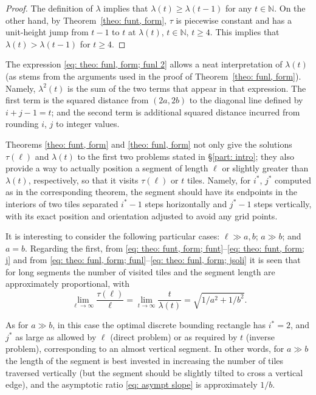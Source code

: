 \documentclass[12pt, a4paper]{article}
\newcommand{\funt}{\tau} %
\newcommand{\funl}{\lambda} %
\newcommand{\len}{\ell} %
\newcommand{\tiles}{t} %
\newcommand{\isoli}{i^\ast}
\newcommand{\jsoli}{j^\ast}
\begin{document}
\begin{proof}
The definition of $\funl$ implies that $\funl(\tiles) \geq \funl(\tiles-1)$ for any $\tiles \in \mathbb N$. On the other hand, 
by Theorem~\ref{theo: funt, form}, $\funt$ is piecewise constant and has a unit-height jump from $\tiles-1$ to $\tiles$ at $\funl(\tiles)$, $\tiles \in \mathbb N$, $\tiles \geq 4$. This implies that $\funl(\tiles) > \funl(\tiles-1)$ for $\tiles \geq 4$.
\end{proof}

The expression \eqref{eq: theo: funl, form; funl 2} allows a neat interpretation of $\funl(\tiles)$ (as stems from the arguments used in the proof of Theorem~\ref{theo: funl, form}). Namely, $\funl^2(\tiles)$ is the sum of the two terms that appear in that expression. The first term is the squared distance from $(2a, 2b)$ to the diagonal line defined by $i+j-1 = \tiles$; and the second term is additional squared distance incurred from rounding $i$, $j$ to integer values.

Theorems \ref{theo: funt, form} and \ref{theo: funl, form} not only give the solutions $\funt(\len)$ and $\funl(\tiles)$ to the first two problems stated in \S\ref{part: intro}; they also provide a way to actually position a segment of length $\len$ or slightly greater than $\funl(\tiles)$, respectively, so that it visits $\funt(\len)$ or $\tiles$ tiles. Namely, for $\isoli$, $\jsoli$ computed as in the corresponding theorem, the segment should have its endpoints in the interiors of two tiles separated $\isoli-1$ steps horizontally and $\jsoli-1$ steps vertically, with its exact position and orientation  adjusted to avoid any grid points.

It is interesting to consider the following particular cases: $\len \gg a,b$; $a \gg b$; and $a=b$. Regarding the first, from \eqref{eq: theo: funt, form; funt}--\eqref{eq: theo: funt, form; j}
and from \eqref{eq: theo: funl, form; funl}--\eqref{eq: theo: funl, form; jsoli}
it is seen that for long segments the number of visited tiles and the segment length are approximately proportional, with
\begin{equation}
\label{eq: asympt slope}
\lim_{\len \rightarrow \infty} \frac{\funt(\len)}{\len}
= \lim_{\tiles \rightarrow \infty} \frac{\tiles}{\funl(\tiles)}
= \sqrt{1/a^2 + 1/b^2}.
\end{equation}

As for $a \gg b$, in this case the optimal discrete bounding rectangle has $\isoli = 2$, and $\jsoli$ as large as allowed by $\len$ (direct problem) or as required by $\tiles$ (inverse problem), corresponding to an almost vertical segment. In other words, for $a \gg b$ the length of the segment is best invested in increasing the number of tiles traversed vertically (but the segment should be slightly tilted to cross a vertical edge), and the asymptotic ratio \eqref{eq: asympt slope} is approximately $1/b$.
\end{document}
